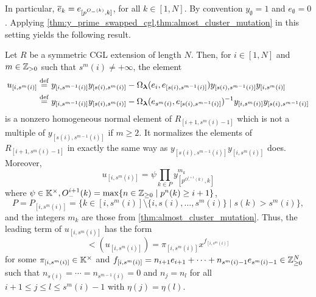 In particular, $\overline{e}_k = e_{[p^{O_{-}(k)}, k]}$, for all $k \in [1, N]$. By convention
$y_{\emptyset} = 1$ and $e_{\emptyset} = 0$. Applying
\cref{thm:y_prime_swapped_cgl,thm:almost_cluster_mutation} in this setting yields the
following result.
\begin{proposition}\label{prop:def_u_brackets}

	Let $R$ be a symmetric CGL extension of length $N$. Then, for $i\in [1, N]$ and $m \in
		\mathbb{Z}_{> 0}$ such that $s^m(i) \neq + \infty$, the element
	\begin{align*}
		u_{[i, s^m(i)]} & \overset{\mathrm{def}}{=} y_{[i, s^{m-1}(i)]}y_{[s(i), s^m(i)]} - \Omega_{\boldsymbol{\lambda}}(e_i, e_{[s(i), s^{m-1}(i)]})y_{[s(i), s^{m-1}(i)]}y_{[i, s^m(i)]}             \\
		                & \overset{\mathrm{def}}{=} y_{[i, s^{m-1}(i)]}y_{[s(i), s^m(i)]} - \Omega_{\boldsymbol{\lambda}}(e_{s^m(i)}, e_{[s(i), s^{m-1}(i)]})^{-1} y_{[i, s^m(i)]}y_{[s(i), s^{m-1}(i)]}
	\end{align*}
	is a nonzero homogeneous normal element of $R_{[i+1, s^m(i) - 1]}$ which is not a
	multiple of $y_{[s(i), s^{m-1}(i)]}$ if $m \geq 2$. It normalizes the elements of
	$R_{[i+1, s^m(i) - 1]}$ in exactly the same way as $y_{[s(i),
						s^{m-1}(i)]}y_{[i,s^m(i)]}$ does. Moreover,
	\begin{equation*}
		u_{[i, s^m(i)]} = \psi \prod_{k \in P} y^{m_k}_{[p^{O_{-}^{i+1}(k)}, k]}
	\end{equation*}
	where $\psi \in \mathbb{K}^\times, O^{i+1}_{-}(k) = \max\{n \in \mathbb{Z}_{\geq 0} \mid p^n(k) \geq i + 1\}$,
	\begin{equation*}
		P = P_{[i,s^m (i)]} = \{k \in [i, s^m(i)]\setminus \{i, s(i), \dots, s^m(i)\} \mid s(k) > s^m(i)\},
	\end{equation*}
	and the integers $m_k$ are those from \cref{thm:almost_cluster_mutation}. Thus, the
	leading term of $u_{[i, s^m(i)]}$ has the form
	\begin{equation*}
		\lt (u_{[i, s^m(i)]}) = \pi_{[i, s^m(i)]} x^{f_{[i, s^m(i)]}}
	\end{equation*}
	for some $\pi_{[i, s^m(i)]} \in \mathbb{K}^\times$ and $f_{[i, s^m(i)]} = n_{i+1}e_{i+1} +
		\cdots + n_{s^m(i) -1}e_{s^m(i)-1} \in \mathbb{Z}_{\geq 0}^N$ such that $n_{s(i)} = \cdots =
		n_{s^{m-1}(i)} = 0$ and $n_j = n_l$ for all $i+1 \leq j \leq l \leq s^m(i)-1$ with
	$\eta(j) = \eta(l)$.
\end{proposition}

